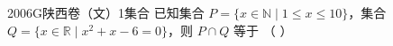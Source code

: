 
\begin{problem}{2006}{G}{陕西卷（文）}{1}{集合}
已知集合 $ P = \{x \in \mathbb{N} \mid 1 \leqslant x \leqslant 10\} $，集合 $ Q = \{x \in \mathbb{R} \mid x^2 + x - 6 = 0\} $，则 $ P \cap Q $ 等于 （ ）
\begin{choices}
\end{choices}
\end{problem}

\begin{answer}

\end{answer}

\begin{solutions}

\end{solutions}